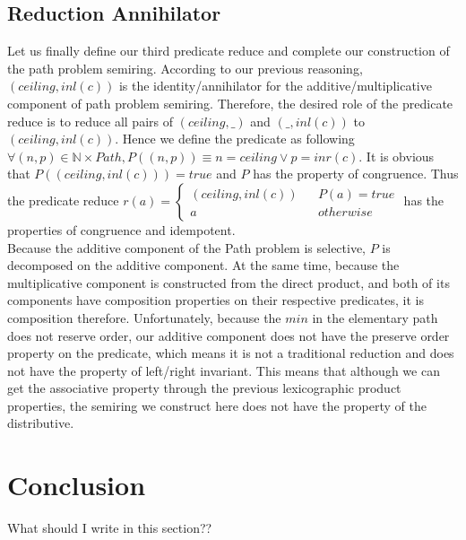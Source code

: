 \documentclass[a4paper,10pt]{article}
\begin{document}
\subsection{Reduction Annihilator}
Let us finally define our third predicate reduce and complete our construction of the path problem semiring. According to our previous reasoning, $(ceiling,inl (c))$ is the identity/annihilator for the additive/multiplicative component of path problem semiring. Therefore, the desired role of the predicate reduce is to reduce all pairs of $(ceiling,\_)$ and $(\_,inl(c))$ to $(ceiling,inl(c))$.
Hence we define the predicate as following $\forall (n,p) \in \mathbb{N}\times Path, P((n,p)) \equiv n = ceiling \vee p = inr(c)$. It is obvious that $P((ceiling,inl (c))) = true$ and $P$ has the property of congruence. Thus the predicate reduce $r(a) = \left\{
\begin{aligned}
(ceiling,inl (c)) &  & P(a) = true \\
a &  & otherwise 
\end{aligned}
\right.$ has the properties of congruence and idempotent.\\
Because the additive component of the Path problem is selective, $P$ is decomposed on the additive component.
At the same time, because the multiplicative component is constructed from the direct product, and both of its components have composition properties on their respective predicates, it is composition therefore.
Unfortunately, because the $min$ in the elementary path does not reserve order, our additive component does not have the preserve order property on the predicate, which means it is not a traditional reduction and does not have the property of left/right invariant. This means that although we can get the associative property through the previous lexicographic product properties, the semiring we construct here does not have the property of the distributive.
\section{Conclusion}
What should I write in this section??
\medskip

 

\end{document}
